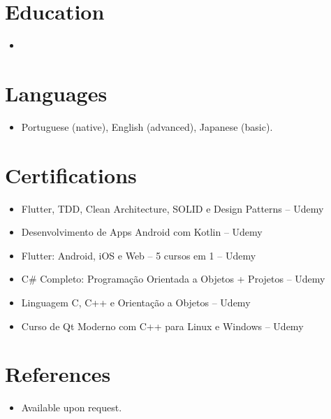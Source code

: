 \documentclass[11pt,a4paper,sans]{moderncv}
\begin{document}

\section{Education}
\vspace{1pt}
\begin{itemize}

\item{}

\end{itemize}


\section{Languages}
\vspace{1pt}
\begin{itemize}
\item {Portuguese (native), English (advanced), Japanese (basic).}
\end{itemize}


\section{Certifications}
\vspace{1pt}
\begin{itemize}
\item{Flutter, TDD, Clean Architecture, SOLID e Design Patterns -- Udemy}
\item{Desenvolvimento de Apps Android com Kotlin -- Udemy}
\item{Flutter: Android, iOS e Web -- 5 cursos em 1 -- Udemy}
\item{C\# Completo: Programação Orientada a Objetos + Projetos -- Udemy}
\item{Linguagem C, C++ e Orientação a Objetos -- Udemy}
\item{Curso de Qt Moderno com C++ para Linux e Windows -- Udemy}
\end{itemize}


\section{References}
\vspace{1pt}
\begin{itemize}
\item{Available upon request.}
\end{itemize}
\end{document}
